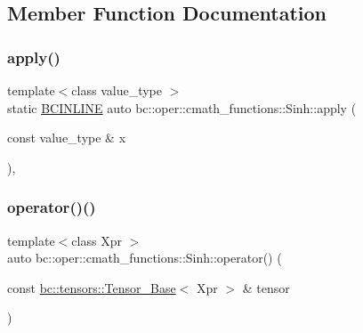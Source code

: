 \subsection{Member Function Documentation}
\mbox{\label{structbc_1_1oper_1_1cmath__functions_1_1Sinh_afd724541590867210a845cc76f089f6a}} 
\subsubsection{\texorpdfstring{apply()}{apply()}}
{\footnotesize\ttfamily template$<$class value\+\_\+type $>$ \\
static \hyperlink{common_8h_a6699e8b0449da5c0fafb878e59c1d4b1}{B\+C\+I\+N\+L\+I\+NE} auto bc\+::oper\+::cmath\+\_\+functions\+::\+Sinh\+::apply (\begin{DoxyParamCaption}\item[{const value\+\_\+type \&}]{x }\end{DoxyParamCaption})\hspace{0.3cm}{\ttfamily [inline]}, {\ttfamily [static]}}

\mbox{\label{structbc_1_1oper_1_1cmath__functions_1_1Sinh_aea0370cc5e2fd162c58148baa43d9dd2}} 
\subsubsection{\texorpdfstring{operator()()}{operator()()}\hspace{0.1cm}{\footnotesize\ttfamily [1/3]}}
{\footnotesize\ttfamily template$<$class Xpr $>$ \\
auto bc\+::oper\+::cmath\+\_\+functions\+::\+Sinh\+::operator() (\begin{DoxyParamCaption}\item[{const \hyperlink{classbc_1_1tensors_1_1Tensor__Base}{bc\+::tensors\+::\+Tensor\+\_\+\+Base}$<$ Xpr $>$ \&}]{tensor }\end{DoxyParamCaption})\hspace{0.3cm}{\ttfamily [inline]}}

